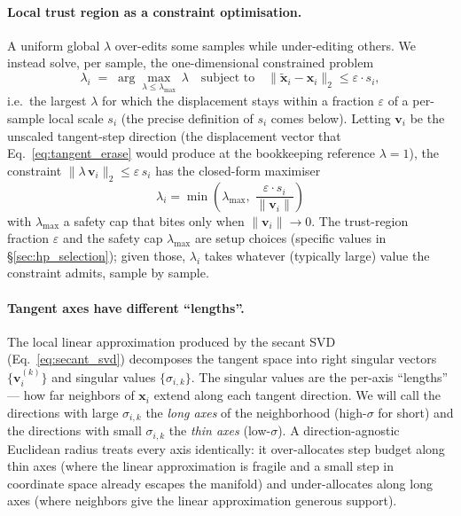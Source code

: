 \paragraph{Local trust region as a constraint optimisation.}
A uniform global $\lambda$ over-edits some samples while under-editing others. We instead solve, per sample, the one-dimensional constrained problem
\begin{equation}
\label{eq:trust_region}
\lambda_i \;=\; \arg\max_{\lambda \le \lambda_{\max}} \, \lambda
\quad \text{subject to} \quad
\| \tilde{\mathbf{x}}_i - \mathbf{x}_i \|_2 \le \varepsilon \cdot s_i,
\end{equation}
i.e.\ the largest $\lambda$ for which the displacement stays within a fraction $\varepsilon$ of a per-sample local scale $s_i$ (the precise definition of $s_i$ comes below). Letting $\mathbf{v}_i$ be the unscaled tangent-step direction (the displacement vector that Eq.~\ref{eq:tangent_erase} would produce at the bookkeeping reference $\lambda{=}1$), the constraint $\|\lambda \, \mathbf{v}_i\|_2 \le \varepsilon \, s_i$ has the closed-form maximiser
\begin{equation}
\label{eq:lambda_closed_form}
\boxed{\;\;\lambda_i = \min\!\left( \lambda_{\max}, \; \frac{\varepsilon \cdot s_i}{\|\mathbf{v}_i\|} \right)\;\;}
\end{equation}
with $\lambda_{\max}$ a safety cap that bites only when $\|\mathbf{v}_i\| \to 0$. The trust-region fraction $\varepsilon$ and the safety cap $\lambda_{\max}$ are setup choices (specific values in §\ref{sec:hp_selection}); given those, $\lambda_i$ takes whatever (typically large) value the constraint admits, sample by sample.

\paragraph{Tangent axes have different ``lengths''.}
The local linear approximation produced by the secant SVD (Eq.~\ref{eq:secant_svd}) decomposes the tangent space into right singular vectors $\{\mathbf{v}_i^{(k)}\}$ and singular values $\{\sigma_{i,k}\}$. The singular values are the per-axis ``lengths'' --- how far neighbors of $\mathbf{x}_i$ extend along each tangent direction. We will call the directions with large $\sigma_{i,k}$ the \emph{long axes} of the neighborhood (high-$\sigma$ for short) and the directions with small $\sigma_{i,k}$ the \emph{thin axes} (low-$\sigma$). A direction-agnostic Euclidean radius treats every axis identically: it over-allocates step budget along thin axes (where the linear approximation is fragile and a small step in coordinate space already escapes the manifold) and under-allocates along long axes (where neighbors give the linear approximation generous support).

